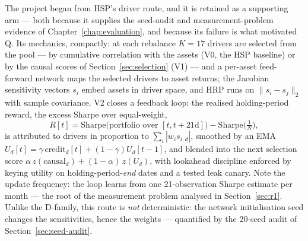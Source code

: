 The project began from HSP's driver route, and it is retained as a supporting
arm --- both because it supplies the seed-audit and measurement-problem
evidence of Chapter~\ref{chap:evaluation}, and because its failure is what
motivated Q. Its mechanics, compactly: at each rebalance $K{=}17$ drivers are
selected from the pool --- by cumulative correlation with the assets (V0, the
HSP baseline) or by the causal scores of Section~\ref{sec:selection} (V1) ---
and a per-asset feed-forward network maps the selected drivers to asset
returns; the Jacobian sensitivity vectors $s_i$ embed assets in driver space,
and HRP runs on $\lVert s_i - s_j\rVert_2$ with sample covariance. V2 closes
a feedback loop: the realised holding-period reward, the excess Sharpe over
equal-weight,
\begin{equation}
  R[t] = \mathrm{Sharpe}\big(\text{portfolio over } [t, t{+}21\text{d}]\big)
       - \mathrm{Sharpe}\big(\tfrac{1}{N}\big),
\end{equation}
is attributed to drivers in proportion to $\sum_i |w_i s_{i,d}|$, smoothed by
an EMA $U_d[t] = \gamma\,\mathrm{credit}_d[t] + (1-\gamma)U_d[t-1]$, and
blended into the next selection score
$\alpha\, z(\mathrm{causal}_d) + (1-\alpha)\, z(U_d)$, with lookahead
discipline enforced by keying utility on holding-period-\emph{end} dates and
a tested leak canary. Note the update frequency: the loop learns from one
21-observation Sharpe estimate per month --- the root of the measurement
problem analysed in Section~\ref{sec:r1}. Unlike the D-family, this route is
\emph{not} deterministic: the network initialisation seed changes the
sensitivities, hence the weights --- quantified by the 20-seed audit of
Section~\ref{sec:seed-audit}.
